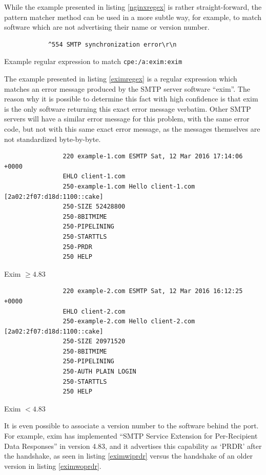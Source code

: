 \documentclass[a4paper,12pt]{article}
\begin{document}
	While the example presented in listing \ref{nginxregex} is rather straight-forward, the pattern matcher method can be used in a more subtle way, for example, to match software which are not advertising their name or version number.
	
	\begin{listing}[H]
		\begin{verbatim}
			^554 SMTP synchronization error\r\n
		\end{verbatim}
		\caption{Example regular expression to match \texttt{cpe:/a:exim:exim}}
		\label{eximregex}
	\end{listing}
	
	The example presented in listing \ref{eximregex} is a regular expression which matches an error message produced by the SMTP server software ``exim''. The reason why it is possible to determine this fact with high confidence is that exim is the only software returning this exact error message verbatim. Other SMTP servers will have a similar error message for this problem, with the same error code, but not with this same exact error message, as the messages themselves are not standardized byte-by-byte.
	
	\begin{multicols}{2}
		\begin{listing}[H]
			\begin{verbatim}
				220 example-1.com ESMTP Sat, 12 Mar 2016 17:14:06 +0000
				EHLO client-1.com
				250-example-1.com Hello client-1.com [2a02:2f07:d18d:1100::cake]
				250-SIZE 52428800
				250-8BITMIME
				250-PIPELINING
				250-STARTTLS
				250-PRDR
				250 HELP
			\end{verbatim}
			\caption{Exim $\ge 4.83$}
			\label{eximwiprdr}
		\end{listing}
		\begin{listing}[H]
			\begin{verbatim}
				220 example-2.com ESMTP Sat, 12 Mar 2016 16:12:25 +0000
				EHLO client-2.com
				250-example-2.com Hello client-2.com [2a02:2f07:d18d:1100::cake]
				250-SIZE 20971520
				250-8BITMIME
				250-PIPELINING
				250-AUTH PLAIN LOGIN
				250-STARTTLS
				250 HELP
			\end{verbatim}
			\caption{Exim $< 4.83$}
			\label{eximwoprdr}
		\end{listing}
	\end{multicols}
	
	It is even possible to associate a version number to the software behind the port. For example, exim has implemented ``SMTP Service Extension for Per-Recipient Data Responses'' in version 4.83, and it advertises this capability as `PRDR' after the handshake, as seen in listing \ref{eximwiprdr} versus the handshake of an older version in listing \ref{eximwoprdr}.
	
\end{document}
